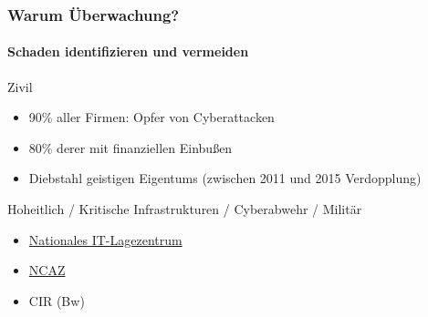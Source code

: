 \begin{frame}
\frametitle{Warum Überwachung?}
\framesubtitle{Schaden identifizieren und vermeiden}
    \begin{exampleblock}{Zivil}
        \begin{itemize}
            \item 90\% aller Firmen: Opfer von Cyberattacken
            \vspace{0.2cm}
            \item 80\% derer mit finanziellen Einbußen
            \vspace{0.2cm}
            \item Diebstahl geistigen Eigentums (zwischen 2011 und 2015 Verdopplung) 
        \end{itemize}
    \end{exampleblock}

\begin{exampleblock}{Hoheitlich / Kritische Infrastrukturen / Cyberabwehr / Militär}
    \begin{itemize}
        \item 
        \href{https://www.bsi.bund.de/DE/Themen/Industrie_KRITIS/KRITIS/Aktivitaeten/IT-Lagezentrum/lagezentrum_node.html}{Nationales
         IT-Lagezentrum}
     \vspace{0.2cm}
        \item 
        \href{https://www.bmi.bund.de/DE/themen/sicherheit/sicherheit-node.html}{NCAZ}
        \vspace{0.2cm}
        \item CIR (Bw)
    \end{itemize}
\end{exampleblock}
    

\end{frame}

